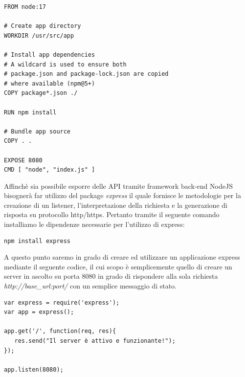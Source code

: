 \documentclass[twoside]{report}
\begin{document}
\begin{listing}[h!]
\begin{verbatim}
FROM node:17

# Create app directory
WORKDIR /usr/src/app

# Install app dependencies
# A wildcard is used to ensure both 
# package.json and package-lock.json are copied
# where available (npm@5+)
COPY package*.json ./

RUN npm install

# Bundle app source
COPY . .

EXPOSE 8080
CMD [ "node", "index.js" ]
\end{verbatim}
\end{listing}
\FloatBarrier

Affinchè sia possibile esporre delle API tramite framework back-end NodeJS bisognerà far utilizzo del package \textit{express} il quale fornisce le metodologie per la creazione di un listener, l'interpretazione della richiesta e la generazione di risposta su protocollo http/https.
\bigbreak
Pertanto tramite il seguente comando installiamo le dipendenze necessarie per l'utilizzo di express:

\begin{listing}[h!]
\begin{verbatim}
npm install express
\end{verbatim}
\end{listing}
\FloatBarrier

A questo punto saremo in grado di creare ed utilizzare un applicazione express mediante il seguente codice, il cui scopo è semplicemente quello di creare un server in ascolto su porta 8080 in grado di rispondere alla sola richiesta \textit{http://base\_url:port/} con un semplice messaggio di stato.

\begin{listing}[h!]
\begin{verbatim}
var express = require('express');
var app = express();

app.get('/', function(req, res){
   res.send("Il server è attivo e funzionante!");
});

app.listen(8080);
\end{verbatim}
\end{listing}
\FloatBarrier
\end{document}
